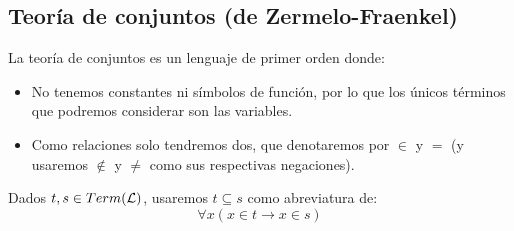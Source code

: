 \subsection{Teoría de conjuntos (de Zermelo-Fraenkel)}
La teoría de conjuntos es un lenguaje de primer orden donde:
\begin{itemize}
    \item No tenemos constantes ni símbolos de función, por lo que los únicos términos que podremos considerar son las variables.
    \item Como relaciones solo tendremos dos, que denotaremos por $\in $ y $=$ (y usaremos $\notin$ y $\neq$ como sus respectivas negaciones).
\end{itemize}

\begin{notacion}
    Dados $t,s\in Term(\mathcal{L})$, usaremos $t\subseteq s$ como abreviatura de:
    \begin{equation*}
        \forall x(x\in t\to x\in s)
    \end{equation*}
\end{notacion}

